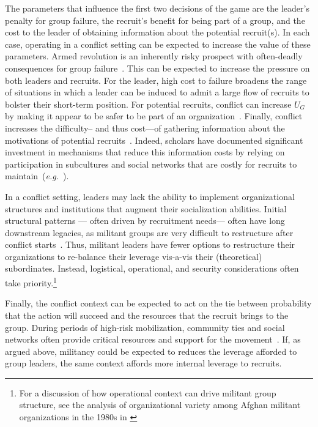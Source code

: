 The parameters that influence the first two decisions of the game are the leader's penalty for group failure, the recruit's benefit for being part of a group, and the cost to the leader of obtaining information about the potential recruit(s).  In each case, operating in a conflict setting can be expected to increase the value of these parameters. Armed revolution is an inherently risky prospect with often-deadly consequences for group failure~\autocite{lichbach1998rebel}. This can be expected to increase the pressure on both leaders and recruits. For the leader, high cost to failure broadens the range of situations in which a leader can be induced to admit a large flow of recruits to bolster their short-term position. For potential recruits, conflict can increase $U_{G}$ by making it appear to be safer to be part of an organization~\autocite{kalyvas2007free}. Finally, conflict increases the difficulty-- and thus cost---of gathering information about the motivations of potential recruits~\autocite{weinstein2005resources}. Indeed, scholars have documented significant investment in mechanisms that reduce this information costs by relying on participation in subcultures and social networks that are costly for recruits to maintain~(\textit{e.g.}~\cite{hegghammer2013recruiter, forney2015can}).

In a conflict setting, leaders may lack the ability to implement organizational structures and institutions that augment their socialization abilities. Initial structural patterns --- often driven by recruitment needs--- often have long downstream legacies, as militant groups are very difficult to restructure after conflict starts~\autocite{staniland2014networks, sinno2010organizations, weinstein2006inside}. Thus, militant leaders have fewer options to restructure their organizations to re-balance their leverage vis-a-vis their (theoretical) subordinates. Instead, logistical, operational, and security considerations often take priority.\footnote{For a discussion of how operational context can drive militant group structure, see the analysis of organizational variety among Afghan militant organizations in the 1980s in \cite[130-134]{sinno2010organizations}}
 

Finally, the conflict context can be expected to act on the tie between probability that the action will succeed and the resources that the recruit brings to the group.  During periods of high-risk mobilization, community ties and social networks often provide critical resources and support for the movement~\autocite{arjona2016rebelocracy, malthaner2015violence, parkinson2013organizing, staniland2014networks, wood2008social}. If, as argued above, militancy could be expected to reduces the leverage afforded to group leaders, the same context affords more internal leverage to recruits.

